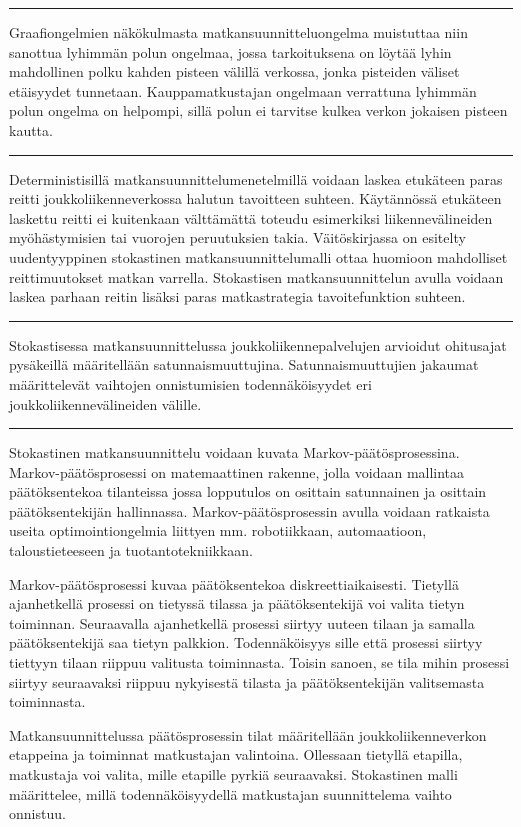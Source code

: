 \documentclass[a4paper,12pt]{article}
\newcommand*\sepline{%
  \begin{center}
    \rule[1ex]{.5\textwidth}{.5pt}
  \end{center}}
\begin{document}
\sepline

Graafiongelmien näkökulmasta matkansuunnitteluongelma muistuttaa niin sanottua lyhimmän polun ongelmaa, jossa
tarkoituksena on löytää lyhin mahdollinen polku kahden pisteen välillä verkossa, jonka pisteiden väliset etäisyydet tunnetaan.
Kauppamatkustajan ongelmaan verrattuna lyhimmän polun ongelma on helpompi, sillä polun ei tarvitse kulkea verkon jokaisen 
pisteen kautta.

\sepline

Deterministisillä matkansuunnittelumenetelmillä voidaan laskea etukäteen paras reitti joukkoliikenneverkossa halutun 
tavoitteen suhteen. Käytännössä etukäteen 
laskettu reitti ei kuitenkaan välttämättä toteudu esimerkiksi liikennevälineiden myöhästymisien tai vuorojen peruutuksien takia. 
Väitöskirjassa on esitelty uudentyyppinen stokastinen matkansuunnittelumalli ottaa huomioon mahdolliset reittimuutokset 
matkan varrella. 
Stokastisen matkansuunnittelun avulla voidaan laskea parhaan reitin lisäksi paras matkastrategia tavoitefunktion suhteen.

\sepline


Stokastisessa matkansuunnittelussa joukkoliikennepalvelujen arvioidut ohitusajat pysäkeillä määritellään satunnaismuuttujina.
Satunnaismuuttujien jakaumat määrittelevät vaihtojen onnistumisien todennäköisyydet eri joukkoliikennevälineiden välille.

\sepline

Stokastinen matkansuunnittelu voidaan kuvata Markov-päätösprosessina. Markov-päätösprosessi on matemaattinen rakenne, jolla
voidaan mallintaa päätöksentekoa tilanteissa jossa lopputulos on osittain satunnainen ja osittain päätöksentekijän hallinnassa.
Markov-päätösprosessin avulla voidaan ratkaista useita optimointiongelmia liittyen mm. robotiikkaan, automaatioon, taloustieteeseen 
ja tuotantotekniikkaan. 

Markov-päätösprosessi kuvaa päätöksentekoa diskreettiaikaisesti. Tietyllä ajanhetkellä prosessi on tietyssä tilassa ja 
päätöksentekijä voi valita tietyn toiminnan. Seuraavalla ajanhetkellä
prosessi siirtyy uuteen tilaan ja samalla päätöksentekijä saa tietyn palkkion.
Todennäköisyys sille että prosessi siirtyy tiettyyn tilaan riippuu valitusta toiminnasta. 
Toisin sanoen, se tila mihin prosessi siirtyy seuraavaksi
riippuu nykyisestä tilasta ja päätöksentekijän valitsemasta toiminnasta.  

Matkansuunnittelussa päätösprosessin tilat määritellään joukkoliikenneverkon etappeina ja toiminnat matkustajan valintoina.
Ollessaan tietyllä etapilla, matkustaja voi valita, mille etapille pyrkiä seuraavaksi. 
Stokastinen malli määrittelee, millä todennäköisyydellä matkustajan suunnittelema vaihto onnistuu.
\end{document}
